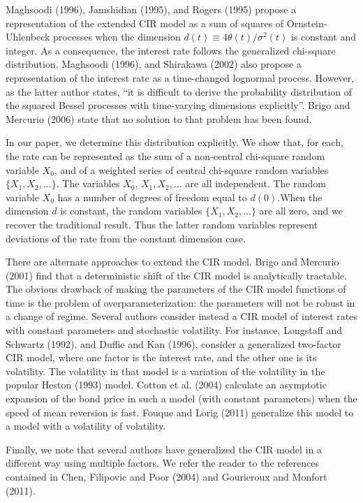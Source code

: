 \documentclass[6pt]{article}
\numberwithin{equation}{section}
\begin{document}
Maghsoodi (1996), Jamshidian (1995), and Rogers (1995) propose a
representation of the extended CIR model as a sum of squares of
Ornstein-Uhlenbeck processes when the dimension $d(t)\equiv 4\theta
(t)/\sigma ^{2}(t)$ is constant and integer. As a consequence, the interest
rate follows the generalized chi-square distribution. Maghsoodi (1996), and
Shirakawa (2002) also propose a representation of the interest rate as a
time-changed lognormal process. However, as the latter author states, \enquote{it is
difficult to derive the probability distribution of the squared Bessel
processes with time-varying dimensions explicitly}. Brigo and Mercurio
(2006) state that no solution to that problem has been found.

In our paper, we determine this distribution explicitly. We show that, for
each, the rate can be represented as the sum of a non-central chi-square
random variable $X_{0}$, and of a weighted series of central chi-square
random variables $\{X_{1},X_{2},\ldots\}$. The variables $X_{0}$, $%
X_{1},X_{2},\ldots$ are all independent. The random variable $X_{0}$ has a
number of degrees of freedom equal to $d(0).$When the dimension $d$ is
constant, the random variables $\{X_{1},X_{2},\ldots\}$ are all zero, and we
recover the traditional result. Thus the latter random variables represent
deviations of the rate from the constant dimension case.

There are alternate approaches to extend the CIR model. Brigo and Mercurio
(2001) find that a deterministic shift of the CIR model is analytically
tractable. The obvious drawback of making the parameters of the CIR model
functions of time is the problem of overparameterization: the parameters
will not be robust in a change of regime. Several authors consider instead a
CIR model of interest rates with constant parameters and stochastic
volatility. For instance, Longstaff and Schwartz (1992), and Duffie and Kan
(1996), consider a generalized two-factor CIR model, where one factor is
the interest rate, and the other one is its volatility. The volatility in
that model is a variation of the volatility in the popular Heston (1993)
model. Cotton et al. (2004) calculate an
asymptotic expansion of the bond price in such a model (with constant
parameters) when the speed of mean reversion is fast. Fouque and Lorig
(2011) generalize this model to a model with a volatility of volatility.

Finally, we note that several authors have generalized the CIR model in a
different way using multiple factors. We refer the reader to the references
contained in Chen, Filipovic and Poor (2004) and Gourieroux and Monfort
(2011).
\end{document}
